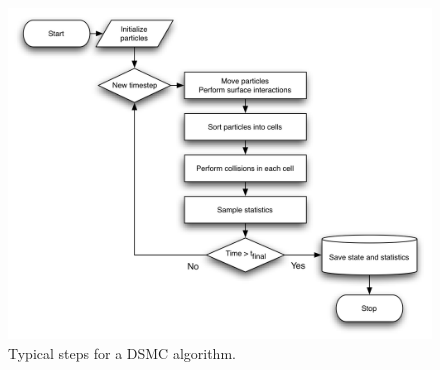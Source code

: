 \begin{figure}[ht]
\begin{center}
\includegraphics[width=\textwidth, trim=0cm 0cm 0cm 0cm, clip]{DSMC/figures/dsmc_flowchart.png}
\end{center}
\caption{Typical steps for a DSMC algorithm.}
\label{fig:dsmc_flowchart}
\end{figure}


